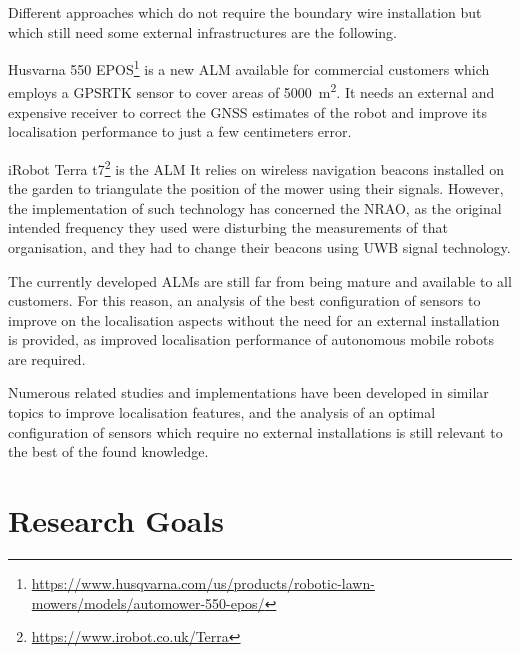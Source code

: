Different approaches which do not require the boundary wire installation but which still need some external infrastructures are the following.

Husvarna 550 EPOS\footnote{\url{https://www.husqvarna.com/us/products/robotic-lawn-mowers/models/automower-550-epos/}} is a new \gls{ALM} available for commercial customers which employs a \gls{GPSRTK} sensor to cover areas of \SI{5000}{\meter\squared}. It needs an external and expensive receiver to correct the \gls{GNSS} estimates of the robot and improve its localisation performance to just a few centimeters error.

iRobot Terra t7\footnote{\url{https://www.irobot.co.uk/Terra}} is the \gls{ALM}
It relies on wireless navigation beacons installed on the garden to triangulate the position of the mower using their signals. However, the implementation of such technology has concerned the \gls{NRAO}, as the original intended frequency they used were disturbing the measurements of that organisation, and they had to change their beacons using \gls{UWB} signal technology.

The currently developed \glspl{ALM} are still far from being mature and available to all customers.
For this reason, an analysis of the best configuration of sensors to improve on the localisation aspects without the need for an external installation is provided, as improved localisation performance of autonomous mobile robots are required.

Numerous related studies and implementations have been developed in similar topics to improve localisation features, and the analysis of an optimal configuration of sensors which require no external installations is still relevant to the best of the found knowledge.


\section{Research Goals}



